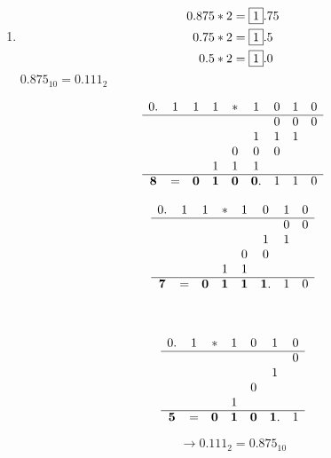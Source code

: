 \documentclass{article}
\begin{document}
\begin{enumerate}[a)]
\begin{enumerate}[1)]
  \item
    \begin{align*}
      0.875 * 2 &= \framebox{1}.75 \\
      0.75  * 2 &= \framebox{1}.5 \\
      0.5   * 2 &= \framebox{1}.0 \\
    \end{align*}
    $0.875_{10} = 0.111_{2}$
    
    \begin{minipage}[t]{.4\textwidth}
      \[
        \begin{array}{cccc cccc c}
          0.&1&1&1&*&1&0&1&0 \\
          \cline{0-8}
            & & & & & &0&0&0 \\
            & & & & &1&1&1 \\
            & & & &0&0&0 \\
            & & &1&1&1 \\
          \cline{0-8}
          \bm{8}&=&\bm{0}&\bm{1}&\bm{0}&\bm{0}.&1&1&0 \\
        \end{array}
      \]
    \end{minipage}
    \hfill
    \begin{minipage}[t]{.4\textwidth}
      \[
        \begin{array}{cccc cccc}
          0.&1&1&*&1&0&1&0 \\
          \cline{0-7}
            & & & & & &0&0 \\
            & & & & &1&1 \\
            & & & &0&0 \\
            & & &1&1 \\
          \cline{0-7}
          \bm{7}&=&\bm{0}&\bm{1}&\bm{1}&\bm{1}.&1&0 \\
        \end{array}
      \]
    \end{minipage}  \\
    
    \begin{minipage}{.4\textwidth}
      \[
        \begin{array}{cccc ccc}
          0.&1&*&1&0&1&0 \\
          \cline{0-6}
            & & & & & &0 \\
            & & & & &1 \\
            & & & &0 \\
            & & &1 \\
          \cline{0-6}
          \bm{5}&=&\bm{0}&\bm{1}&\bm{0}&\bm{1}.&1 \\
        \end{array}
      \]
    \end{minipage}
    \hfill
    \begin{minipage}{.4\textwidth}
      \[
        \rightarrow 0.111_{2} = 0.875_{10}
      \]
    \end{minipage}


\end{enumerate}
\end{enumerate}
\end{document}
